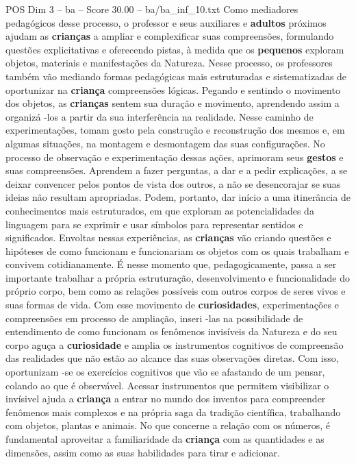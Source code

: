 \begin{textsample}{POS Dim 3 – ba – Score 30.00 – ba/ba\_inf\_10.txt}
Como mediadores pedagógicos desse processo, o professor e seus auxiliares e \textbf{adultos} próximos ajudam as \textbf{crianças} a ampliar e complexificar suas compreensões, formulando questões explicitativas e oferecendo pistas, à medida que os \textbf{pequenos} exploram objetos, materiais e manifestações da Natureza.
Nesse processo, os professores também vão mediando formas pedagógicas mais estruturadas e sistematizadas de oportunizar na \textbf{criança} compreensões lógicas.
Pegando e sentindo o movimento dos objetos, as \textbf{crianças} sentem sua duração e movimento, aprendendo assim a organizá -los a partir da sua interferência na realidade.
Nesse caminho de experimentações, tomam gosto pela construção e reconstrução dos mesmos e, em algumas situações, na montagem e desmontagem das suas configurações.
No processo de observação e experimentação dessas ações, aprimoram seus \textbf{gestos} e suas compreensões.
Aprendem a fazer perguntas, a dar e a pedir explicações, a se deixar convencer pelos pontos de vista dos outros, a não se desencorajar se suas ideias não resultam apropriadas.
Podem, portanto, dar início a uma itinerância de conhecimentos mais estruturados, em que exploram as potencialidades da linguagem para se exprimir e usar símbolos para representar sentidos e significados.
Envoltas nessas experiências, as \textbf{crianças} vão criando questões e hipóteses de como funcionam e funcionariam os objetos com os quais trabalham e convivem cotidianamente.
É nesse momento que, pedagogicamente, passa a ser importante trabalhar a própria estruturação, desenvolvimento e funcionalidade do próprio corpo, bem como as relações possíveis com outros corpos de seres vivos e suas formas de vida.
Com esse movimento de \textbf{curiosidades}, experimentações e compreensões em processo de ampliação, inseri -las na possibilidade de entendimento de como funcionam os fenômenos invisíveis da Natureza e do seu corpo aguça a \textbf{curiosidade} e amplia os instrumentos cognitivos de compreensão das realidades que não estão ao alcance das suas observações diretas.
Com isso, oportunizam -se os exercícios cognitivos que vão se afastando de um pensar, colando ao que é observável.
Acessar instrumentos que permitem visibilizar o invísivel ajuda a \textbf{criança} a entrar no mundo dos inventos para compreender fenômenos mais complexos e na própria saga da tradição científica, trabalhando com objetos, plantas e animais.
No que concerne a relação com os números, é fundamental aproveitar a familiaridade da \textbf{criança} com as quantidades e as dimensões, assim como as suas habilidades para tirar e adicionar.

\end{textsample}

